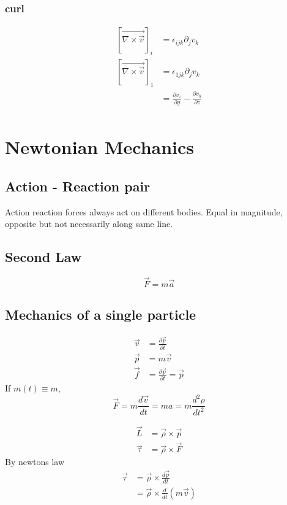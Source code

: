 \documentclass{book}
\begin{document}
\subsection{curl}
\[
  \begin{aligned}
    \left[ \vec{\nabla \times \vec{v}}\right]_{i} & = \epsilon_{ijk} \partial_jv_k                                          \\
    \left[ \vec{\nabla \times \vec{v}}\right]_{1} & = \epsilon_{1jk} \partial_jv_k                                          \\
                                                  & = \frac{\partial{v_z}}{\partial{y}} - \frac{\partial{v_y}}{\partial{z}} \\
  \end{aligned}
\]
\chapter{Newtonian Mechanics}
\section{Action - Reaction pair}
Action reaction forces always act on different bodies.
Equal in magnitude, opposite but not necessarily along same line.
\section{Second Law}

\[\vec{F}=m \vec{a}\]
\section{Mechanics of a single particle}
\[
  \begin{aligned}
    \vec{v} & = \frac{\partial{\vec{p}}}{\partial{t}}         \\
    \vec{p} & =m \vec{v}                                      \\
    \vec{f} & =\frac{\partial \vec{{p}}}{\partial{t}}=\vec{p}
  \end{aligned}
\]
If \(m(t)\equiv m\),
\[
  \vec{F}= m \frac{d{\vec{v}}}{d{t}}=ma=m\frac{d^2 \rho}{dt ^{2} }
\]


\[
  \begin{aligned}
    \vec{L}    & =\vec{\rho} \times \vec{p} \\
    \vec{\tau} & =\vec{\rho} \times \vec{F}
  \end{aligned}
\]
By newtons law
\[
  \begin{aligned}
    \vec{\tau} & = \vec{\rho} \times  \frac{d \vec{p}}{dt}   \\
               & = \vec{\rho} \times \frac{d}{dt}(m \vec{v})
  \end{aligned}
\]
\end{document}
